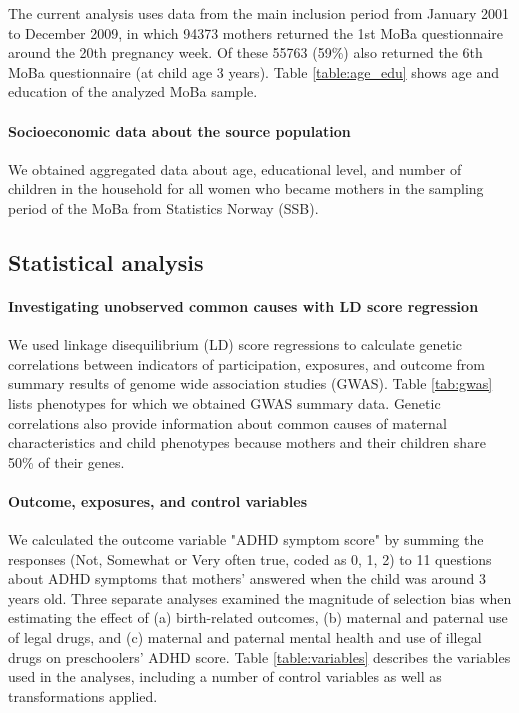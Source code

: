 \documentclass[]{article}
\begin{document}
The current analysis uses data from the main inclusion period from January 2001 to December 2009, in which 94373 mothers returned the 1st MoBa questionnaire around the 20th pregnancy week. Of these 55763 (59\%) also returned the 6th MoBa questionnaire (at child age 3 years). Table \ref{table:age_edu} shows age and education of the analyzed MoBa sample.

\begin{table}[ht]
	
	\label{table:age_edu}
\end{table}

\paragraph{Socioeconomic data about the source population}
We obtained aggregated data about age, educational level, and number of children in the household for all women who became mothers in the sampling period of the MoBa from Statistics Norway (SSB). 


\subsection{Statistical analysis}

\paragraph{Investigating unobserved common causes with LD score regression} We used linkage disequilibrium (LD) score regressions \supercite{Bulik-Sullivan2015-er} to calculate genetic correlations between indicators of participation, exposures, and outcome from summary results of genome wide association studies (GWAS). Table \ref{tab:gwas} lists phenotypes for which we obtained GWAS summary data. Genetic correlations also provide information about common causes of maternal characteristics and child phenotypes because mothers and their children share 50\% of their genes.

\paragraph{Outcome, exposures, and control variables} We calculated the outcome variable "ADHD symptom score" by summing the responses (Not, Somewhat or Very often true, coded as 0, 1, 2) to 11 questions about ADHD symptoms that mothers' answered when the child was around 3 years old. Three separate analyses examined the magnitude of selection bias when estimating the effect of (a) birth-related outcomes, (b) maternal and paternal use of legal drugs, and (c) maternal and paternal mental health and use of illegal drugs on preschoolers' ADHD score. Table \ref{table:variables} describes the variables used in the analyses, including a number of control variables as well as transformations applied. 
\end{document}
